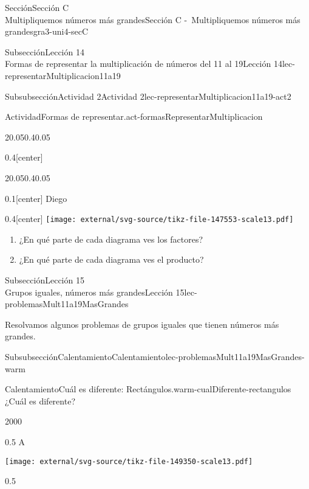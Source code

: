 \begin{sectionptx}{Sección}{{\Large Sección C\\}Multipliquemos números más grandes}{}{Sección C -~Multipliquemos números más grandes}{}{}{gra3-uni4-secC}
\begin{subsectionptx}{Subsección}{{\normalsize Lección 14\\[-0.05cm]}Formas de representar la multiplicación de números del 11 al 19}{}{Lección 14}{}{}{lec-representarMultiplicacion11a19}
\begin{subsubsectionptx}{Subsubsección}{Actividad 2}{}{Actividad 2}{}{}{lec-representarMultiplicacion11a19-act2}
\begin{activity}{Actividad}{Formas de representar.}{act-formasRepresentarMultiplicacion}
\begin{sidebyside}{2}{0.05}{0.4}{0.05}
\begin{sbspanel}{0.4}[center]
\end{sbspanel}%
\end{sidebyside}%
\begin{sidebyside}{2}{0.05}{0.4}{0.05}%
\begin{sbspanel}{0.1}[center]%
Diego%
\end{sbspanel}%
\begin{sbspanel}{0.4}[center]%
\texttt{[image: external/svg-source/tikz-file-147553-scale13.pdf]}
\end{sbspanel}%
\end{sidebyside}%
%
\begin{enumerate}
\item{}¿En qué parte de cada diagrama ves los factores?%
\item{}¿En qué parte de cada diagrama ves el producto?%
\end{enumerate}
\end{activity}%
\end{subsubsectionptx}
\end{subsectionptx}
%
%
\typeout{************************************************}
\typeout{************************************************}
%
\clearpage
\begin{subsectionptx}{Subsección}{{\normalsize Lección 15\\[-0.05cm]}Grupos iguales, números más grandes}{}{Lección 15}{}{}{lec-problemasMult11a19MasGrandes}
\begin{introduction}{}%
Resolvamos algunos problemas de grupos iguales que tienen números más grandes.%
\end{introduction}%
%
%
\typeout{************************************************}
\typeout{************************************************}
%
\begin{subsubsectionptx}{Subsubsección}{Calentamiento}{}{Calentamiento}{}{}{lec-problemasMult11a19MasGrandes-warm}
\begin{exploration}{Calentamiento}{Cuál es diferente: Rectángulos.}{warm-cualDiferente-rectangulos}%
¿Cuál es diferente?%
\begin{sidebyside}{2}{0}{0}{0}%
\begin{sbspanel}{0.5}%
A%
\par
\texttt{[image: external/svg-source/tikz-file-149350-scale13.pdf]}
\end{sbspanel}%
\begin{sbspanel}{0.5}%

\end{sbspanel}
\end{sidebyside}
\end{exploration}
\end{subsubsectionptx}
\end{subsectionptx}
\end{sectionptx}
